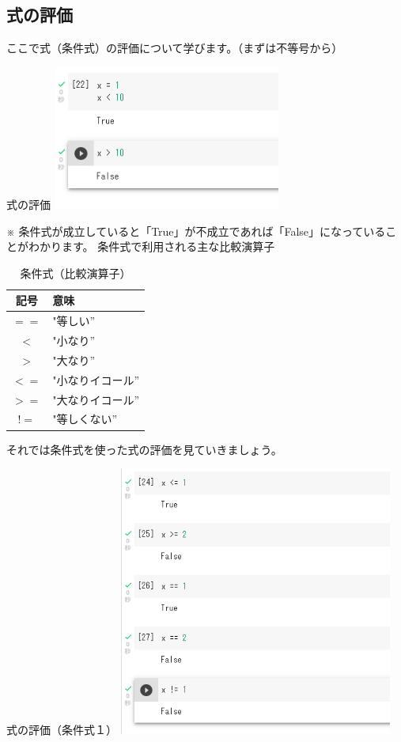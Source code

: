 \documentclass[11pt,a4paper,dvipdfmx,titlepage]{jsreport}
\begin{document}
\subsection{式の評価}
ここで式（条件式）の評価について学びます。（まずは不等号から）
\begin{grabox}{式の評価}
\includegraphics[width=7.5cm]{images/colab12.png}
\end{grabox}
※ 条件式が成立していると「True」が不成立であれば「False」になっていることがわかります。
\newpage
条件式で利用される主な比較演算子
\begin{table}[h]
 \begin{center}
    \caption{条件式（比較演算子）}
\begin{tabular}{|c|p{4cm}|} 
\hline
記号 & 意味　\\ \hline \hline
 $ == $ & "等しい” \\ \hline
 $ < $ & "小なり” \\ \hline
 $ > $ & "大なり” \\ \hline
 $ <= $ & "小なりイコール” \\ \hline
 $ >= $ & "大なりイコール” \\ \hline
 $ != $ & "等しくない” \\ \hline
\end{tabular}
\end{center}
\end{table}

それでは条件式を使った式の評価を見ていきましょう。
\begin{grabox}{式の評価（条件式１）}
\includegraphics[width=9cm]{images/colab13.png}
\end{grabox}
\end{document}
